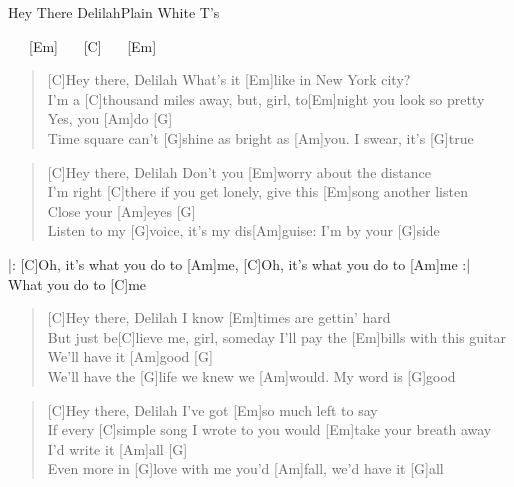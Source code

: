 \begin{song}{Hey There Delilah}{Plain White T's}

    \begin{intro}
        [C] \ \ \ [Em] \ \ \ [C] \ \ \ [Em]
    \end{intro}

    \begin{verse}  
        [C]Hey there, Delilah
        What's it [Em]like in New York city? \\
        I'm a [C]thousand miles away, but, girl, to[Em]night you look so pretty \\
        Yes, you [Am]do\hspace{1em} [G] \\
        [F]Time square can't [G]shine as bright as [Am]you. I swear, it's [G]true
    \end{verse}  

    \begin{verse}  
        [C]Hey there, Delilah
        Don't you [Em]worry about the distance \\
        I'm right [C]there if you get lonely, give this [Em]song another listen \\
        Close your [Am]eyes\hspace{1em} [G] \\
        [F]Listen to my [G]voice, it's my dis[Am]guise: I'm by your [G]side
    \end{verse}  

    \begin{chorus}
        |: [C]Oh, it's what you do to [Am]me, [C]Oh, it's what you do to [Am]me :| \\
        What you do to [C]me
    \end{chorus}

    \begin{verse}  
        [C]Hey there, Delilah
        I know [Em]times are gettin' hard \\
        But just be[C]lieve me, girl, someday I'll pay the [Em]bills with this guitar \\
        We'll have it [Am]good\hspace{1em} [G] \\
        [F]We'll have the [G]life we knew we [Am]would. My word is [G]good
    \end{verse}  

    \begin{verse}  
        [C]Hey there, Delilah I've got [Em]so much left to say \\
        If every [C]simple song I wrote to you would [Em]take your breath away \\
        I'd write it [Am]all\hspace{1em} [G] \\
        [F]Even more in [G]love with me you'd [Am]fall, we'd have it [G]all
    \end{verse}  


\end{song}
